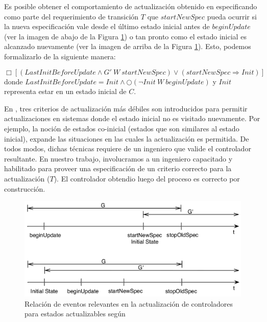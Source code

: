 Es posible obtener el comportamiento de actualización obtenido en \cite{6224401} especificando como parte del
requerimiento de transición $T$ que $startNewSpec$ pueda ocurrir si la nueva especificación vale desde el último estado
inicial antes de $beginUpdate$ (ver la imagen de abajo de la Figura \ref{ghezzi}) o tan pronto como el estado inicial es
alcanzado nuevamente (ver la imagen de arriba de la Figura \ref{ghezzi}). Esto, podemos formalizarlo de la siguiente manera:

\vspace{-1cm}
\begin{equation}
\label{ghezzi_formula}
\Box [(LastInitBeforeUpdate \wedge G'\ W\ startNewSpec) \lor (startNewSpec \Longrightarrow Init)]
\end{equation}
\noindent donde $LastInitBeforeUpdate = Init \wedge \bigcirc(\neg Init\ W\ beginUpdate)$ y $Init$ representa estar en un estado inicial de
$C$.

En \cite{PanzicaLaManna:2013:FCC:2487336.2487349}, tres criterios de actualización más débiles son introducidos para
permitir actualizaciones en sistemas donde el estado inicial no es visitado nuevamente. Por ejemplo, la noción de
estados co-inicial (estados que son similares al estado inicial), expande las situaciones en las cuales la actualización
es permitida. De todos modos, dichas técnicas requiere de un ingeniero que valide el controlador resultante. En nuestro trabajo,
involucramos a un ingeniero capacitado y habilitado para proveer una especificación de un criterio correcto para la
actualización ($T$). El controlador obtendio luego del proceso es correcto por construcción.

\begin{figure}[H]
\centering
\includegraphics[scale=0.35]{img/Ghezzi.png}
\caption{Relación de eventos relevantes en la actualización de controladores para estados actualizables
según \cite{6224401}}
\label{ghezzi}
\end{figure}


